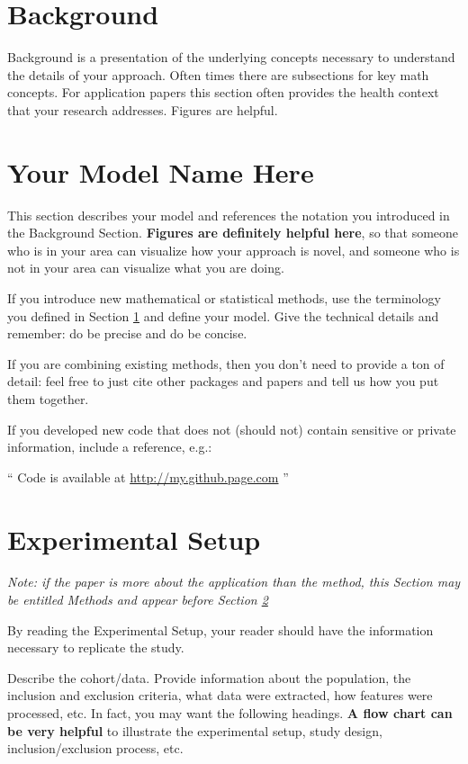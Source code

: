 \documentclass[twoside,11pt]{article}
\begin{document}
\section{Background} \label{background}
Background is a presentation of the underlying concepts necessary to understand the details of your approach. Often times there are subsections for key math concepts. For application papers this section often provides the health context that your research addresses. Figures are helpful.

\section{Your Model Name Here} \label{model}
This section describes your model and references the notation you introduced in the Background Section. \textbf{Figures are definitely helpful here}, so that someone who is in your area can visualize how your approach is novel, and someone who is not in your area can visualize what you are doing.

If you introduce new mathematical or statistical methods, use the terminology you defined in Section \ref{background} and define your model. Give the technical details and remember: do be precise and do be concise.

If you are combining existing methods, then you don't need to provide a ton of detail: feel free to just cite other packages and papers and tell us how you put them together.  

If you developed new code that does not (should not) contain sensitive or private information, include a reference, e.g.:

`` Code is available at \url{http://my.github.page.com} ''

\section{Experimental Setup} \label{experiment}
\emph{Note: if the paper is more about the application than the method, this Section may be entitled Methods and appear before Section \ref{model}}

By reading the Experimental Setup, your reader should have the information necessary to replicate the study.

Describe the cohort/data. Provide information about the population, the inclusion and exclusion criteria, what data were extracted, how features were processed, etc. In fact, you may want the following headings. \textbf{A flow chart can be very helpful} to illustrate the experimental setup, study design, inclusion/exclusion process, etc.
\end{document}

